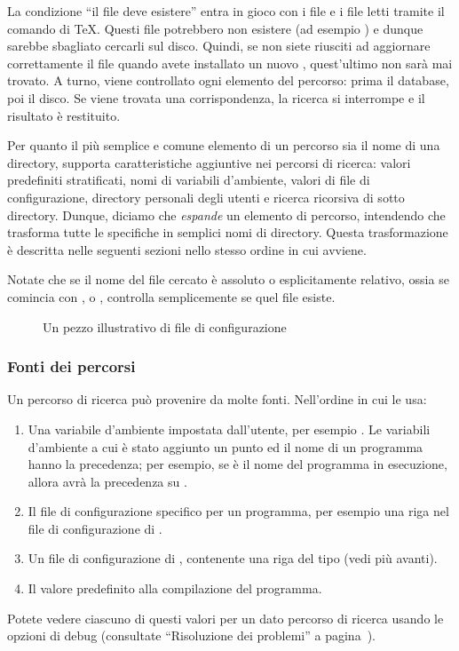 \documentclass{article}
\begin{document}
La condizione ``il file deve esistere'' entra in gioco con i file
 e i file letti tramite il comando  di \TeX. Questi
file potrebbero non esistere (ad esempio ) e dunque sarebbe
sbagliato cercarli sul disco. Quindi, se non siete riusciti ad aggiornare
correttamente il file  quando avete installato un nuovo
, quest'ultimo non sarà mai trovato. A turno, viene controllato
ogni elemento del percorso: prima il database, poi il disco.  Se viene
trovata una corrispondenza, la ricerca si interrompe e il risultato è
restituito. 

Per quanto il più semplice e comune elemento di un percorso sia il nome di
una directory, \KPS{} supporta caratteristiche aggiuntive nei percorsi di
ricerca: valori predefiniti stratificati, nomi di variabili
d'ambiente, valori di file di configurazione, directory personali degli
utenti e ricerca ricorsiva di sotto directory. Dunque, diciamo che \KPS{}
\emph{espande} un elemento di percorso, intendendo che trasforma tutte le
specifiche in semplici nomi di directory. Questa trasformazione è
descritta nelle seguenti sezioni nello stesso ordine in cui avviene.

Notate che se il nome del file cercato è assoluto o esplicitamente relativo,
ossia se comincia con \samp{/},  o , \KPS{} controlla
semplicemente se quel file esiste.

\ifSingleColumn
\else
\begin{figure*}

\setlength{\abovecaptionskip}{0pt}
  \caption{Un pezzo illustrativo di file di configurazione}
  \label{fig:config-sample}
\end{figure*}
\fi

\subsubsection{Fonti dei percorsi}
\label{sec:path-sources}

Un percorso di ricerca può provenire da molte fonti. Nell'ordine in cui
\KPS{} le usa:

\begin{enumerate}
\item
  Una variabile d'ambiente impostata dall'utente, per esempio
  \@. Le variabili d'ambiente a cui è stato aggiunto un
  punto ed il nome di un programma hanno la precedenza; per esempio, se
   è il nome del programma in esecuzione, allora
   avrà la precedenza su .
\item
  Il file di configurazione specifico per un programma, per esempio una
  riga  nel file di configurazione  di
  .
\item
  Un file di configurazione  di \KPS, contenente una riga
  del tipo  (vedi più avanti).
\item Il valore predefinito alla compilazione del programma.
\end{enumerate}
\noindent Potete vedere ciascuno di questi valori per un dato percorso di
ricerca usando le opzioni di debug (consultate ``Risoluzione dei
problemi'' a pagina~\pageref{sec:debugging}).
\end{document}
